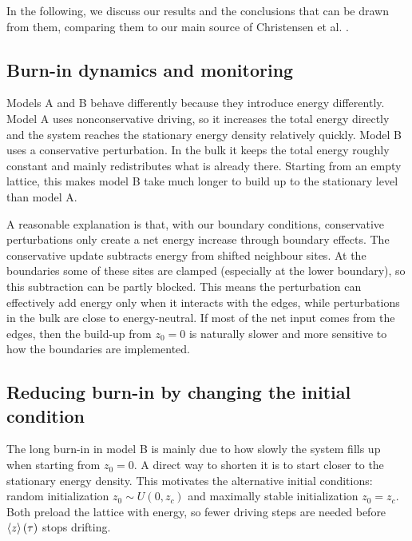 In the following, we discuss our results and the conclusions that can be drawn from them, comparing them to our main source of Christensen et al. \cite{christensen1991dynamical}.

\subsection{Burn-in dynamics and monitoring}

Models A and B behave differently because they introduce energy differently. Model A uses nonconservative driving, so it increases the total energy directly and the system reaches the stationary energy density relatively quickly. Model B uses a conservative perturbation. In the bulk it keeps the total energy roughly constant and mainly redistributes what is already there. Starting from an empty lattice, this makes model B take much longer to build up to the stationary level than model A.

A reasonable explanation is that, with our boundary conditions, conservative perturbations only create a net energy increase through boundary effects. The conservative update subtracts energy from shifted neighbour sites. At the boundaries some of these sites are clamped (especially at the lower boundary), so this subtraction can be partly blocked. This means the perturbation can effectively add energy only when it interacts with the edges, while perturbations in the bulk are close to energy-neutral. If most of the net input comes from the edges, then the build-up from $z_0=0$ is naturally slower and more sensitive to how the boundaries are implemented.

\subsection{Reducing burn-in by changing the initial condition}

The long burn-in in model B is mainly due to how slowly the system fills up when starting from $z_0=0$. A direct way to shorten it is to start closer to the stationary energy density. This motivates the alternative initial conditions: random initialization $z_0\sim U(0,z_c)$ and maximally stable initialization $z_0=z_c$. Both preload the lattice with energy, so fewer driving steps are needed before $\expval{z}(\tau)$ stops drifting.

